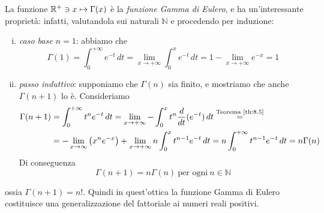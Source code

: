 \begin{remark}
    La funzione $\amsbb{R}^+\ni x \mapsto \Gamma(x)$ è la \emph{funzione Gamma di Eulero}, e ha un'interessante proprietà: infatti, valutandola sui naturali $\mathbb{N}$ e procedendo per induzione:
    \begin{enumerate}[(i)]
        \item \emph{caso base $n=1$}: abbiamo che
        \[
        \Gamma(1) = \int_0^{+\infty} e^{-t}\, dt = \lim_{x\to +\infty} \int_0^x e^{-t}\, dt = 1-\lim_{x\to+\infty}e^{-x} = 1 
        \]
        \item \emph{passo induttivo}: supponiamo che $\Gamma(n)$ sia finito, e mostriamo che anche $\Gamma(n+1)$ lo è. Consideriamo
        \[
        \begin{split}
            \Gamma(n+1) & = \int_0^{+\infty} t^n e^{-t}\, dt = \lim_{x\to +\infty} -\int_0^x t^{n}\frac{d}{dt}(e^{-t})\, dt \overset{\text{Teorema \ref{th:8.5}}}{=} \\
            & = -\lim_{x\to\infty}\left(x^ne^{-x}\right)+\lim_{x\to+\infty} n\int_0^x t^{n-1} e^{-t}\, dt = n \int_0^{+\infty} t^{n-1}e^{-t}\, dt = n\Gamma(n)
        \end{split}
        \]
        Di conseguenza 
        \[
        \Gamma(n+1)=n\Gamma(n) \ \text{per ogni} \ n\in\mathbb{N}
        \]
    \end{enumerate}
    ossia $\Gamma(n+1)=n!$. Quindi in quest'ottica la funzione Gamma di Eulero costituisce una generalizzazione del fattoriale ai numeri reali positivi.
\end{remark}
\newpage